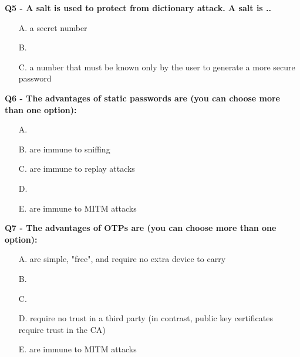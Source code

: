 \textbf{Q5 - A salt is used to protect from dictionary attack. A salt is ..}
\begin{enumerate}
    \item[A.] a secret number
    \item[B.] 
    \item[C.] a number that must be known only by the user to generate a more secure password
\end{enumerate}

\textbf{Q6 - The advantages of static passwords are (you can choose more than one option):}
\begin{enumerate}
    \item[A.] 
    \item[B.] are immune to sniffing
    \item[C.] are immune to replay attacks
    \item[D.] 
    \item[E.] are immune to MITM attacks
\end{enumerate}

\textbf{Q7 - The advantages of OTPs are (you can choose more than one option):}
\begin{enumerate}
    \item[A.] are simple, "free", and require no extra device to carry
    \item[B.] 
    \item[C.] 
    \item[D.] require no trust in a third party (in contrast, public key certificates require trust in the CA) 
    \item[E.] are immune to MITM attacks
\end{enumerate}

